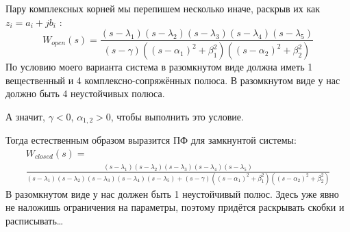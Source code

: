 Пару комплексных корней мы перепишем несколько иначе, раскрыв их как $z_i = a_i + jb_i$ :
$$
W_{open}(s) = \frac{(s-\lambda_1)(s-\lambda_2)(s-\lambda_3)(s-\lambda_4)(s-\lambda_5)}{(s-\gamma)( (s-\alpha_1)^2 +\beta_1^2)( (s-\alpha_2)^2 +\beta_2^2)}
$$
По условию моего варианта система в разомкнутом виде должна иметь 1 вещественный и 4 комплексно-сопряжённых полюса. В разомкнутом виде у нас должно быть 4 неустойчивых полюса. 

А значит,  $\gamma < 0$, $\alpha_{1,2} > 0$, чтобы выполнить это условие.

Тогда естественным образом выразится ПФ для замкнунтой системы:
$$
\begin{aligned}
  W_{closed}(s) = \\
  \frac{(s-\lambda_1)(s-\lambda_2)(s-\lambda_3)(s-\lambda_4)(s-\lambda_5)}{ (s-\lambda_1)(s-\lambda_2)(s-\lambda_3)(s-\lambda_4)(s-\lambda_5) + (s-\gamma)( (s-\alpha_1)^2 +\beta_1^2)( (s-\alpha_2)^2 +\beta_2^2) }
\end{aligned}
$$
В разомкнутом виде у нас должен быть 1 неустойчивый полюс. Здесь уже явно не наложишь ограничения на параметры, поэтому придётся раскрывать скобки и расписывать\dots

